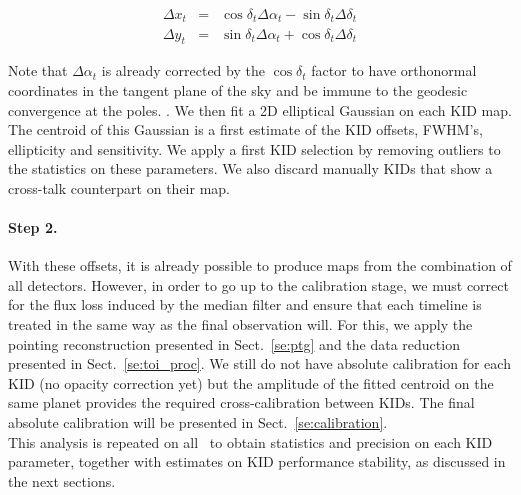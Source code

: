 \begin{eqnarray}
\Delta x_t &=& \cos\delta_t \Delta\alpha_t - \sin \delta_t\Delta \delta_t \nonumber \\
\Delta y_t &=& \sin\delta_t \Delta\alpha_t + \cos \delta_t\Delta \delta_t \nonumber
\end{eqnarray}

Note that $\Delta\alpha_t$ is already corrected by the $\cos\delta_t$ factor to
have orthonormal coordinates in the tangent plane of the sky and be immune to
the geodesic convergence at the poles. . We then fit a 2D elliptical Gaussian on
each KID map. The centroid of this Gaussian is a first estimate of the KID
offsets, FWHM's, ellipticity and sensitivity. We apply a first KID selection by
removing outliers to the statistics on these parameters. We also discard
manually KIDs that show a cross-talk counterpart on their map.

\paragraph{Step 2.} With these offsets, it is already possible to produce maps
from the combination of all detectors. However, in order to go up to
the calibration stage, we must correct for the flux loss induced by
the median filter and ensure that each timeline is treated in the same
way as the final observation will. For this, we apply the pointing
reconstruction presented in Sect.~\ref{se:ptg} and the data reduction
presented in Sect.~\ref{se:toi_proc}. We still do not have absolute
calibration for each KID (no opacity correction yet) but the amplitude
of the fitted centroid on the same planet provides the required
cross-calibration between KIDs. The final absolute calibration will be
presented in Sect.~\ref{se:calibration}.\\

This analysis is repeated on all \bms\ to obtain statistics and
precision on each KID parameter, together with estimates on KID
performance stability, as discussed in the next sections.


